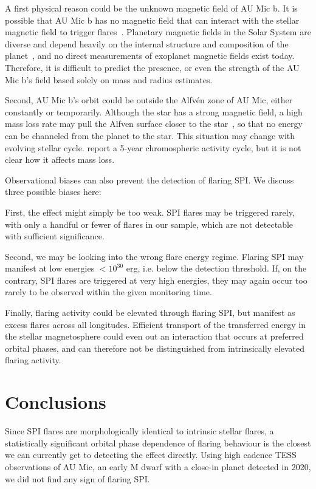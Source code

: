 \documentclass[fleqn,usenatbib,letters]{mnras}%
\begin{document}
A first physical reason could be the unknown magnetic field of AU Mic b. It is possible that AU Mic b has no magnetic field that can interact with the stellar magnetic field to trigger flares~\citep{lanza2018close-by}. Planetary magnetic fields in the Solar System are diverse and depend heavily on the internal structure and composition of the planet~\citep{stevenson2003planetary}, and no direct measurements of exoplanet magnetic fields exist today. Therefore, it is difficult to predict the presence, or even the strength of the AU Mic b's field based solely on mass and radius estimates.

Second, AU Mic b's orbit could be outside the Alfv\'en zone of AU Mic, either constantly or temporarily. Although the star has a strong magnetic field, a high mass loss rate may pull the Alfven surface closer to the star~\citep{kavanagh2021}, so that no energy can be channeled from the planet to the star. This situation may change with evolving stellar cycle. \citet{ibanezbustos2019first} report a 5-year chromospheric activity cycle, but it is not clear how it affects mass loss.

Observational biases can also prevent the detection of flaring SPI. We discuss three possible biases here:

First, the effect might simply be too weak. SPI flares may be triggered rarely, with only a handful or fewer of flares in our sample, which are not detectable with sufficient significance. 

Second, we may be looking into the wrong flare energy regime. Flaring SPI may manifest at low energies $<10^{30}$ erg, i.e. below the detection threshold. If, on the contrary, SPI flares are triggered at very high energies, they may again occur too rarely to be observed within the given monitoring time.

Finally, flaring activity could be elevated through flaring SPI, but manifest as excess flares across all longitudes. Efficient transport of the transferred energy in the stellar magnetosphere could even out an interaction that occurs at preferred orbital phases, and can therefore not be distinguished from intrinsically elevated flaring activity.

\section{Conclusions}
\label{sec:conclusions}
Since SPI flares are morphologically identical to intrinsic stellar flares, a statistically significant orbital phase dependence of flaring behaviour is the closest we can currently get to detecting the effect directly. Using high cadence TESS observations of AU Mic, an early M dwarf with a close-in planet detected in 2020, we did not find any sign of flaring SPI.
\end{document}
